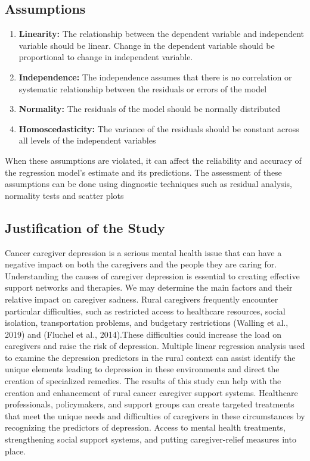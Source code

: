 \documentclass[12pt]{article}
\numberwithin{equation}{section}
\begin{document}
\subsection{Assumptions}
\begin{enumerate}
\item\textbf{ Linearity:} The relationship between the dependent variable and independent variable should be linear. Change in the dependent variable should be proportional to change in independent variable.
\item \textbf{Independence:} The independence assumes that there is no correlation or systematic relationship between the residuals or errors of the model
\item \textbf{Normality:} The residuals of the model should be normally distributed
\item \textbf{Homoscedasticity:} The variance of the residuals should be constant across all levels of the independent variables
\end{enumerate}
When these assumptions are violated, it can affect the reliability and accuracy of the regression model's estimate and its predictions. The assessment of these assumptions can be done using diagnostic techniques such as residual analysis, normality tests and scatter plots

\subsection{Justification of the Study}
Cancer caregiver depression is a serious mental health issue that can have a negative impact on both the caregivers and the people they are caring for. Understanding the causes of caregiver depression is essential to creating effective support networks and therapies. We may determine the main factors and their relative impact on caregiver sadness. Rural caregivers frequently encounter particular difficulties, such as restricted access to healthcare resources, social isolation, transportation problems, and budgetary restrictions (Walling et al., 2019) and (Fluchel et al., 2014).These difficulties could increase the load on caregivers and raise the risk of depression. Multiple linear regression analysis used to examine the depression predictors in the rural context can assist identify the unique elements leading to depression in these environments and direct the creation of specialized remedies. The results of this study can help with the creation and enhancement of rural cancer caregiver support systems. Healthcare professionals, policymakers, and support groups can create targeted treatments that meet the unique needs and difficulties of caregivers in these circumstances by recognizing the predictors of depression. Access to mental health treatments, strengthening social support systems, and putting caregiver-relief measures into place.
\end{document}

